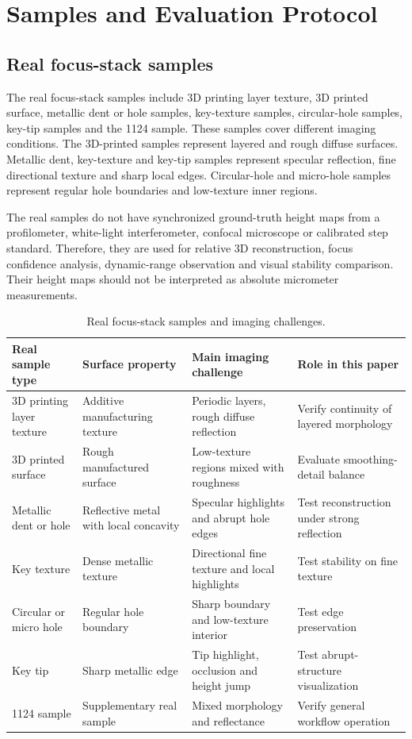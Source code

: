 \documentclass[11pt,a4paper]{article}
\begin{document}
\section{Samples and Evaluation Protocol}

\subsection{Real focus-stack samples}

The real focus-stack samples include 3D printing layer texture, 3D printed surface, metallic dent or hole samples, key-texture samples, circular-hole samples, key-tip samples and the 1124 sample. These samples cover different imaging conditions. The 3D-printed samples represent layered and rough diffuse surfaces. Metallic dent, key-texture and key-tip samples represent specular reflection, fine directional texture and sharp local edges. Circular-hole and micro-hole samples represent regular hole boundaries and low-texture inner regions.

The real samples do not have synchronized ground-truth height maps from a profilometer, white-light interferometer, confocal microscope or calibrated step standard. Therefore, they are used for relative 3D reconstruction, focus confidence analysis, dynamic-range observation and visual stability comparison. Their height maps should not be interpreted as absolute micrometer measurements.

\begin{table}[htbp]
\centering
\caption{Real focus-stack samples and imaging challenges.}
\small
\begin{tabularx}{\textwidth}{p{}p{}p{}X}
\toprule
Real sample type & Surface property & Main imaging challenge & Role in this paper \\
\midrule
3D printing layer texture & Additive manufacturing texture & Periodic layers, rough diffuse reflection & Verify continuity of layered morphology \\
3D printed surface & Rough manufactured surface & Low-texture regions mixed with roughness & Evaluate smoothing-detail balance \\
Metallic dent or hole & Reflective metal with local concavity & Specular highlights and abrupt hole edges & Test reconstruction under strong reflection \\
Key texture & Dense metallic texture & Directional fine texture and local highlights & Test stability on fine texture \\
Circular or micro hole & Regular hole boundary & Sharp boundary and low-texture interior & Test edge preservation \\
Key tip & Sharp metallic edge & Tip highlight, occlusion and height jump & Test abrupt-structure visualization \\
1124 sample & Supplementary real sample & Mixed morphology and reflectance & Verify general workflow operation \\
\bottomrule
\end{tabularx}
\end{table}
\end{document}
